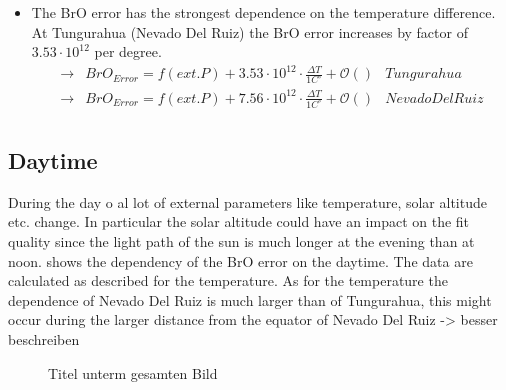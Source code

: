 \documentclass  [
  paper    = a4,
  BCOR     = 10mm,
  twoside,
  fontsize = 12pt,
  fleqn,
  toc      = bibnumbered,
  toc      = listofnumbered,
  numbers  = noendperiod,
  headings = normal,
  listof   = leveldown,
  version  = 3.03
]                                       {scrreprt}
\begin{document}
	\begin{itemize}
		\item The BrO error has the strongest dependence on the temperature difference. At Tungurahua (Nevado Del Ruiz) the BrO error increases by factor of $3.53\cdot10^{12}$  per degree.
		\begin{align*}
		\rightarrow&  BrO_{Error} = f(ext. P)+ 3.53\cdot10^{12}\cdot\frac{\Delta T}{1C^{\circ}} + \mathcal{O}\left(\right) & Tungurahua\\
		\rightarrow&  BrO_{Error} = f(ext. P)+7.56\cdot10^{12}\cdot\frac{\Delta T}{1C^{\circ}} + \mathcal{O}\left(\right) & Nevado Del Ruiz\\
		\end{align*}
	\end{itemize}
	\subsection{Daytime}
	During the day o al lot of external parameters like temperature, solar altitude etc. change. In particular the solar altitude could have an impact on the fit quality since the light path of the sun is much longer at the evening than at noon.  shows the dependency of the BrO error on the daytime. The data are calculated as described for the temperature. As for the temperature the dependence of Nevado Del Ruiz is much larger than of Tungurahua, this might occur during the larger distance from the equator of Nevado Del Ruiz -> besser beschreiben
	\begin{figure}[h!]			
		\caption{Titel unterm gesamten Bild}
		\label{fig:diffdaytime}
	\end{figure}
\end{document}
